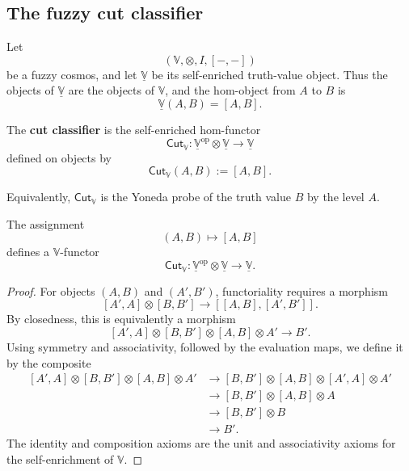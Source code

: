 \subsection{The fuzzy cut classifier}
\label{subsec:fuzzy-cut-classifier}

Let
\[
    (\mathbb V,\otimes,I,[-,-])
\]
be a fuzzy cosmos, and let \(\underline{\mathbb V}\) be its self-enriched truth-value object. Thus the objects of \(\underline{\mathbb V}\) are the objects of \(\mathbb V\), and the hom-object from \(A\) to \(B\) is
\[
    \underline{\mathbb V}(A,B)=[A,B].
\]

\begin{definition}
\label{def:cut-classifier}
    The \textbf{cut classifier} is the self-enriched hom-functor
    \[
        \mathsf{Cut}_{\mathbb V}:
        \underline{\mathbb V}^{\mathrm{op}}
        \otimes
        \underline{\mathbb V}
        \longrightarrow
        \underline{\mathbb V}
    \]
    defined on objects by
    \[
        \mathsf{Cut}_{\mathbb V}(A,B):=[A,B].
    \]
\end{definition}

Equivalently, \(\mathsf{Cut}_{\mathbb V}\) is the Yoneda probe of the truth value \(B\) by the level \(A\).

\begin{proposition}
\label{prop:intrinsic-cut-classifier-is-functor}
    The assignment
    \[
        (A,B)\longmapsto [A,B]
    \]
    defines a \(\mathbb V\)-functor
    \[
        \mathsf{Cut}_{\mathbb V}:
        \underline{\mathbb V}^{\mathrm{op}}
        \otimes
        \underline{\mathbb V}
        \longrightarrow
        \underline{\mathbb V}.
    \]
\end{proposition}

\begin{proof}
    For objects \((A,B)\) and \((A',B')\), functoriality requires a morphism
    \[
        [A',A]\otimes [B,B']
        \longrightarrow
        [[A,B],[A',B']].
    \]
    By closedness, this is equivalently a morphism
    \[
        [A',A]\otimes [B,B']\otimes [A,B]\otimes A'
        \longrightarrow
        B'.
    \]
    Using symmetry and associativity, followed by the evaluation maps, we define it by the composite
    \[
        \begin{aligned}
            [A',A]\otimes [B,B']\otimes [A,B]\otimes A'
            &\longrightarrow
            [B,B']\otimes [A,B]\otimes [A',A]\otimes A'
            \\
            &\longrightarrow
            [B,B']\otimes [A,B]\otimes A
            \\
            &\longrightarrow
            [B,B']\otimes B
            \\
            &\longrightarrow
            B'.
        \end{aligned}
    \]
    The identity and composition axioms are the unit and associativity axioms for the self-enrichment of \(\mathbb V\).
\end{proof}

